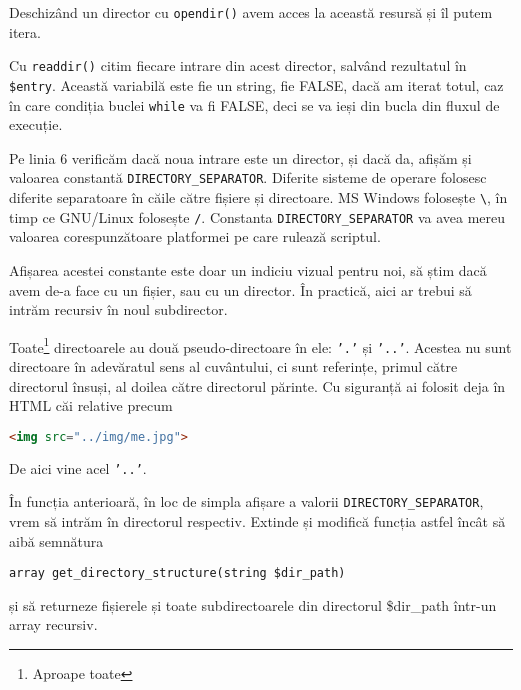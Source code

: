 Deschizând un director cu \texttt{opendir()} avem
acces la această resursă și îl putem itera.

Cu \texttt{readdir()} citim fiecare intrare din acest
director, salvând rezultatul în \texttt{\$entry}.
Această variabilă este fie un string, fie FALSE,
dacă am iterat totul, caz în care condiția buclei
\texttt{while} va fi FALSE, deci se va ieși din
bucla din fluxul de execuție.

Pe linia 6 verificăm dacă noua intrare este un
director, și dacă da, afișăm și valoarea
constantă \texttt{DIRECTORY\_SEPARATOR}.
Diferite sisteme de operare folosesc diferite
separatoare în căile către fișiere și directoare.
MS Windows folosește \texttt{\textbackslash}, în timp ce GNU/Linux
folosește \texttt{/}. Constanta \texttt{DIRECTORY\_SEPARATOR}
va avea mereu valoarea corespunzătoare platformei
pe care rulează scriptul.

Afișarea acestei
constante este doar un indiciu vizual pentru noi,
să știm dacă avem de-a face cu un fișier, sau cu un
director. În practică, aici ar trebui să
intrăm recursiv în noul subdirector.

Toate\footnote{Aproape toate} directoarele
au două pseudo-directoare în ele: \texttt{'.'}
și \texttt{'..'}. Acestea nu sunt directoare
în adevăratul sens al cuvântului, ci sunt referințe,
primul către directorul însuși, al doilea către
directorul părinte. Cu siguranță ai folosit
deja în HTML căi relative precum
\begin{lstlisting}[language=HTML]
<img src="../img/me.jpg">
\end{lstlisting}
De aici vine acel \texttt{'..'}.

\begin{Exercise}[title={Determinarea recursivă a conținutului unui director},difficulty=2]
În funcția anterioară, în loc de simpla afișare
a valorii \texttt{DIRECTORY\_SEPARATOR}, vrem să intrăm în
directorul respectiv. Extinde și modifică funcția
astfel încât să aibă semnătura
\begin{verbatim}
array get_directory_structure(string $dir_path)
\end{verbatim}
și să returneze fișierele și toate subdirectoarele din
directorul \$dir\_path într-un array recursiv.
\end{Exercise}


